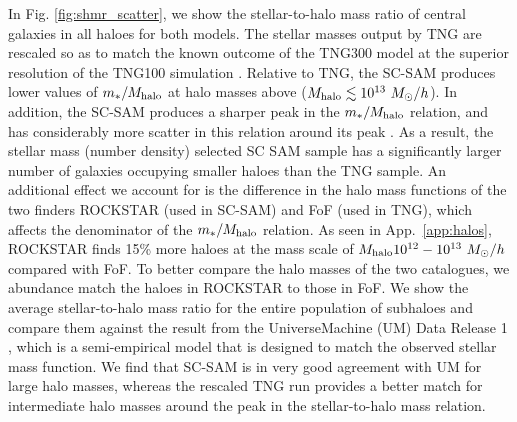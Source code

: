 \documentclass[fleqn,usenatbib]{mnras}
\newcommand{\rss}[1]{\textcolor{purple}{(rss: #1)}}
\begin{document}
In Fig. \ref{fig:shmr_scatter}, we show the stellar-to-halo mass ratio of central galaxies in all haloes for both models. 
The stellar masses output by TNG are rescaled so as to match the known outcome of the TNG300 model at the superior resolution of the TNG100 simulation \citep[see][for more details]{2018MNRAS.475..648P}. Relative to TNG, the SC-SAM produces lower values of $m_*/M_{\rm halo}$ at halo masses above ($M_{\rm halo} \lesssim 10^{13} \ M_\odot/h$). In addition, the SC-SAM produces a sharper peak in the $m_*/M_{\rm halo}$ relation, and has considerably more scatter in this relation around its peak \citep[see also][]{Austen+2021}. As a result, the stellar mass (number density) selected SC SAM sample has a significantly larger number of galaxies occupying smaller haloes than the TNG sample.
An additional effect we account for is the difference in the halo mass functions of the two finders \textsc{ROCKSTAR} (used in SC-SAM) and FoF (used in TNG), which affects the denominator of the $m_*/M_{\rm halo}$ relation. As seen in App.~\ref{app:halos}, \textsc{ROCKSTAR} finds 15\% more haloes at the mass scale of $M_{\rm halo} 10^{12} - 10^{13} \ M_\odot/h$ compared with FoF. To better compare the halo masses of the two catalogues, we abundance match the haloes in \textsc{ROCKSTAR} to those in FoF. We show the average stellar-to-halo mass ratio for the entire population of subhaloes and compare them against the result from the UniverseMachine (UM) Data Release 1 \citep{2019MNRAS.488.3143B}, which is a semi-empirical model that is designed to match the observed stellar mass function. We find that SC-SAM is in very good agreement with UM for large halo masses, whereas the rescaled TNG \citep[rTNG, see][for details]{2018MNRAS.475..648P} run provides a better match for intermediate halo masses around the peak in the stellar-to-halo mass relation. 
\end{document}
